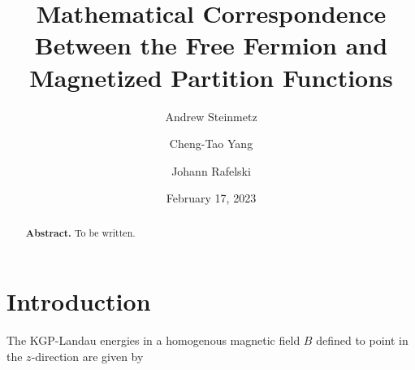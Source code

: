 \documentclass[
aps,
pra,
showpacs,
preprintnumbers,
amsmath,
amssymb,
footinbib
]{revtex4-2}
\begin{document}

\title{Mathematical Correspondence Between the Free Fermion and Magnetized Partition Functions}
\author{Andrew Steinmetz}
\author{Cheng-Tao Yang}
\author{Johann Rafelski}
\date{February 17, 2023}

\begin{abstract}
\noindent\textbf{Abstract.} To be written. 
\end{abstract}
\maketitle

\section{Introduction}\label{sec:CHIsec}

\noindent The KGP-Landau energies in a homogenous magnetic field $B$ defined to point in the $z$-direction are given by
\end{document}
